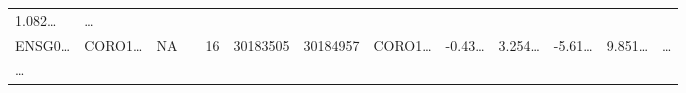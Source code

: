 \documentclass[
]{article}
\begin{document}
\begin{longtable}[]{@{}lllllllllllll@{}}
\begin{minipage}[t]{0.05\columnwidth}
1.082\ldots{}\strut
\end{minipage} & \begin{minipage}[t]{0.02\columnwidth}\raggedright
\ldots{}\strut
\end{minipage}\tabularnewline
\begin{minipage}[t]{0.05\columnwidth}\raggedright
ENSG0\ldots{}\strut
\end{minipage} & \begin{minipage}[t]{0.05\columnwidth}\raggedright
CORO1\ldots{}\strut
\end{minipage} & \begin{minipage}[t]{0.05\columnwidth}\raggedright
NA\strut
\end{minipage} & \begin{minipage}[t]{0.05\columnwidth}\raggedright
\strut
\end{minipage} & \begin{minipage}[t]{0.05\columnwidth}\raggedright
16\strut
\end{minipage} & \begin{minipage}[t]{0.05\columnwidth}\raggedright
30183505\strut
\end{minipage} & \begin{minipage}[t]{0.05\columnwidth}\raggedright
30184957\strut
\end{minipage} & \begin{minipage}[t]{0.05\columnwidth}\raggedright
CORO1\ldots{}\strut
\end{minipage} & \begin{minipage}[t]{0.05\columnwidth}\raggedright
-0.43\ldots{}\strut
\end{minipage} & \begin{minipage}[t]{0.05\columnwidth}\raggedright
3.254\ldots{}\strut
\end{minipage} & \begin{minipage}[t]{0.05\columnwidth}\raggedright
-5.61\ldots{}\strut
\end{minipage} & \begin{minipage}[t]{0.05\columnwidth}\raggedright
9.851\ldots{}\strut
\end{minipage} & \begin{minipage}[t]{0.02\columnwidth}\raggedright
\ldots{}\strut
\end{minipage}\tabularnewline
\begin{minipage}[t]{0.05\columnwidth}\raggedright
\ldots{}\strut
\end{minipage} & \begin{minipage}[t]{0.05\columnwidth}\raggedright

\end{minipage}
\end{longtable}
\end{document}
